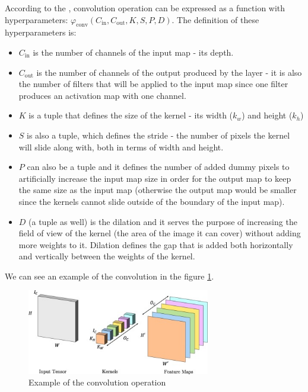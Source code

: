 According to the \cite{Santosh2022-2}, convolution operation can be expressed as a function with hyperparameters: $\varphi_{\text{conv}}(C_{\text{in}}, C_{\text{out}}, K, S, P, D)$. The definition of these hyperparameters is:

\begin{itemize}
    \item $C_{\text{in}}$ is the number of channels of the input map - its depth.
    \item $C_{\text{out}}$ is the number of channels of the output produced by the layer - it is also the number of filters that will be applied to the input map since one filter produces an activation map with one channel.
    \item $K$ is a tuple that defines the size of the kernel - its width ($k_w$) and height ($k_h$)
    \item $S$ is also a tuple, which defines the stride - the number of pixels the kernel will slide along with, both in terms of width and height.
    \item $P$ can also be a tuple and it defines the number of added dummy pixels to artificially increase the input map size in order for the output map to keep the same size as the input map (otherwise the output map would be smaller since the kernels cannot slide outside of the boundary of the input map).
    \item $D$ (a tuple as well) is the dilation and it serves the purpose of increasing the field of view of the kernel (the area of the image it can cover) without adding more weights to it. Dilation defines the gap that is added both horizontally and vertically between the weights of the kernel.
\end{itemize}

We can see an example of the convolution in the figure \ref{fig:convolution}.

\begin{figure}[H]
\begin{centering}
\includegraphics[width=8cm]{assets/images/conv.jpg}
\par\end{centering}
\caption{Example of the convolution operation \cite{Santosh2022-2}}
\label{fig:convolution}
\end{figure}

